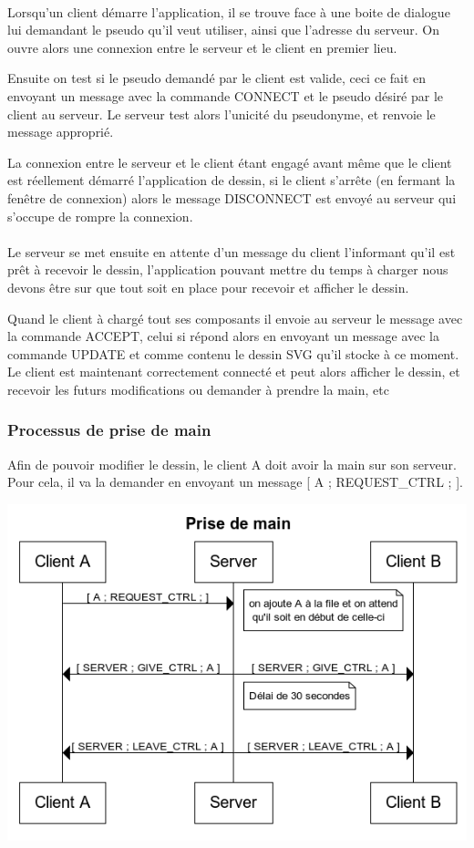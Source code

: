 \documentclass[a4paper,11pt]{article}
\begin{document}
\paragraph{}Lorsqu'un client démarre l'application, il se trouve face à une boite de dialogue lui demandant le pseudo qu'il veut utiliser, ainsi que l'adresse du serveur. On ouvre alors une connexion entre le serveur et le client en premier lieu.

Ensuite on test si le pseudo demandé par le client est valide, ceci ce fait en envoyant un message avec la commande CONNECT et le pseudo désiré par le client au serveur. Le serveur test alors l'unicité du pseudonyme, et renvoie le message approprié.

La connexion entre le serveur et le client étant engagé avant même que le client est réellement démarré l'application de dessin, si le client s'arrête (en fermant la fenêtre de connexion) alors le message DISCONNECT est envoyé au serveur qui s'occupe de rompre la connexion.


\paragraph{} Le serveur se met ensuite en attente d'un message du client l'informant qu'il est prêt à recevoir le dessin, l'application pouvant mettre du temps à charger nous devons être sur que tout soit en place pour recevoir et afficher le dessin.

Quand le client à chargé tout ses composants il envoie au serveur le message avec la commande ACCEPT, celui si répond alors en envoyant un message avec la commande UPDATE et comme contenu le dessin SVG qu'il stocke à ce moment. Le client est maintenant correctement connecté et peut alors afficher le dessin, et recevoir les futurs modifications ou demander à prendre la main, etc

\subsubsection{Processus de prise de main}
Afin de pouvoir modifier le dessin, le client A doit avoir la main sur son serveur. Pour cela, il va la demander en envoyant un message [ A ; REQUEST\_CTRL ; ].

\includegraphics[scale=1]{image/Prise_de_main.png}
\end{document}
